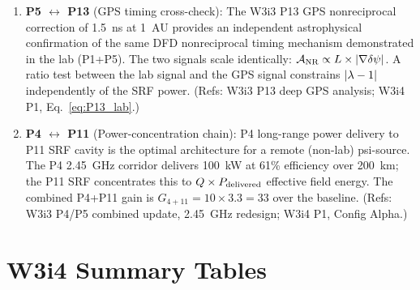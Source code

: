 \begin{enumerate}[label=\textbf{CR-\arabic*.}, leftmargin=*, itemsep=4pt]
\item \textbf{P5 $\leftrightarrow$ P13} (GPS timing cross-check):
The W3i3 P13 GPS nonreciprocal correction of 1.5~ns at 1~AU provides an
independent astrophysical confirmation of the same DFD nonreciprocal
timing mechanism demonstrated in the lab (P1+P5). The two signals scale
identically: $\mathcal{A}_{\rm NR} \propto L \times |\nabla\delta\psi|$. A
ratio test between the lab signal and the GPS signal constrains $|\lambda - 1|$
independently of the SRF power. (Refs: W3i3 P13 deep GPS analysis; W3i4 P1,
Eq.~\eqref{eq:P13_lab}.)

\item \textbf{P4 $\leftrightarrow$ P11} (Power-concentration chain):
P4 long-range power delivery to P11 SRF cavity is the optimal
architecture for a remote (non-lab) psi-source. The P4 2.45~GHz
corridor delivers 100~kW at 61\% efficiency over 200~km; the P11 SRF
concentrates this to $Q \times P_{\rm delivered}$ effective field energy.
The combined P4+P11 gain is $G_{4+11} = 10 \times 3.3 = 33$ over the
baseline. (Refs: W3i3 P4/P5 combined update, 2.45~GHz redesign; W3i4 P1,
Config Alpha.)

\end{enumerate}

\section{W3i4 Summary Tables}
\label{sec:summary}

